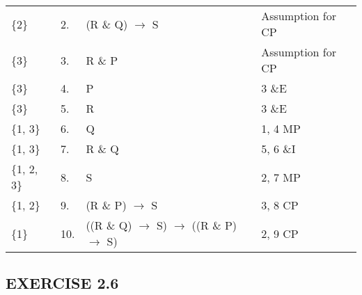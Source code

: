 \documentclass[a4paper,12pt]{article}
\newcommand{\ra}{$\rightarrow$ }
\begin{document}
\begin{enumerate}[label=\arabic*,leftmargin=*]
\begin{enumerate}[label=\arabic*.]
\begin{minipage}{\textwidth}
\begin{tabular}{l l l l}
                        \{2\} & 2. & (R \& Q) \ra S & Assumption for CP\\
                        \{3\} & 3. & R \& P & Assumption for CP\\
                        \{3\} & 4. & P & 3 \&E\\
                        \{3\} & 5. & R & 3 \&E\\
                        \{1, 3\} & 6. & Q & 1, 4 MP\\
                        \{1, 3\} & 7. & R \& Q & 5, 6 \&I\\
                        \{1, 2, 3\} & 8. & S & 2, 7 MP\\
                        \{1, 2\} & 9. & (R \& P) \ra S & 3, 8 CP\\
                        \{1\} & 10. & ((R \& Q) \ra S) \ra ((R \& P) \ra S) & 2, 9 CP\\
                    \end{tabular}
                \end{minipage}

            \end{enumerate}

    \end{enumerate}

    \subsection*{EXERCISE 2.6}
\end{document}

